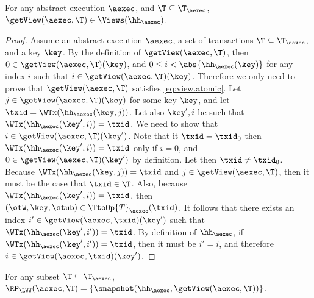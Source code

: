 \begin{proposition}
\label{prop:getview.valid}
For any abstract execution $\aexec$, and $\T \subseteq \T_{\aexec}$, 
$\getView(\aexec, \T) \in \Views(\hh_{\aexec})$.
\end{proposition}
\begin{proof}
Assume an abstract execution $\aexec$, a set of transactions $\T \subseteq \T_{\aexec}$, and a key \( \key \).
By the definition of $\getView(\aexec, \T)$, 
then $0 \in \getView(\aexec, \T)(\key)$, and 
$0 \leq i < \abs{ \hh_{\aexec}(\key) }$ for any index \( i \) such that $i \in \getView(\aexec, \T)(\key)$.
Therefore we only need to prove that $\getView(\aexec, \T)$ satisfies \eqref{eq:view.atomic}.
Let $j \in \getView(\aexec, \T)(\key)$ for some key $\key$, and let $\txid = 
\WTx(\hh_{\aexec}(\key, j))$. Let also $\key', i$ be such that 
$\WTx(\hh_{\aexec}(\key', i)) = \txid$. We need to show that 
$i \in \getView(\aexec, \T)(\key')$. Note that it $\txid = \txid_{0}$ 
then $\WTx(\hh_{\aexec}(\key', i)) = \txid$ only if $i = 0$, and 
$0 \in \getView(\aexec, \T)(\key')$ by definition. 
Let then $\txid \neq \txid_{0}$. Because $\WTx(\hh_{\aexec}(\key, j)) = \txid$ 
and $j \in \getView(\aexec, \T)$, then it must be the case that $\txid \in \T$. 
Also, because $\WTx(\hh_{\aexec}(\key', i)) = \txid$, then $(\otW, \key, \stub) \in 
\TtoOp{T}_{\aexec}(\txid)$. It follows that there exists an index $i' \in \getView(\aexec, \txid)(\key')$ 
such that $\WTx(\hh_{\aexec}(\key', i')) = \txid$. By definition of 
$\hh_{\aexec}$, if $\WTx(\hh_{\aexec}(\key', i')) = \txid$, then it must 
be $i' = i$, and therefore $i \in \getView(\aexec, \txid)(\key')$.
\end{proof}


\begin{proposition}
\label{prop:compatible.aexec2kv}
For any subset $\T \subseteq \T_{\aexec}$, $\RP_{\LWW}(\aexec, \T) = \{\snapshot(\hh_{\aexec}, \getView(\aexec, \T))\}$.
\end{proposition}

